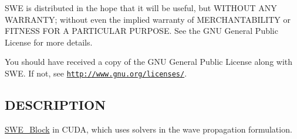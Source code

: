 S\-W\-E is distributed in the hope that it will be useful, but W\-I\-T\-H\-O\-U\-T A\-N\-Y W\-A\-R\-R\-A\-N\-T\-Y; without even the implied warranty of M\-E\-R\-C\-H\-A\-N\-T\-A\-B\-I\-L\-I\-T\-Y or F\-I\-T\-N\-E\-S\-S F\-O\-R A P\-A\-R\-T\-I\-C\-U\-L\-A\-R P\-U\-R\-P\-O\-S\-E. See the G\-N\-U General Public License for more details.

You should have received a copy of the G\-N\-U General Public License along with S\-W\-E. If not, see \href{http://www.gnu.org/licenses/}{\tt http\-://www.\-gnu.\-org/licenses/}.\hypertarget{NetCdfWriter_8hh_DESCRIPTION}{}\subsection{D\-E\-S\-C\-R\-I\-P\-T\-I\-O\-N}\label{NetCdfWriter_8hh_DESCRIPTION}
\hyperlink{classSWE__Block}{S\-W\-E\-\_\-\-Block} in C\-U\-D\-A, which uses solvers in the wave propagation formulation. 